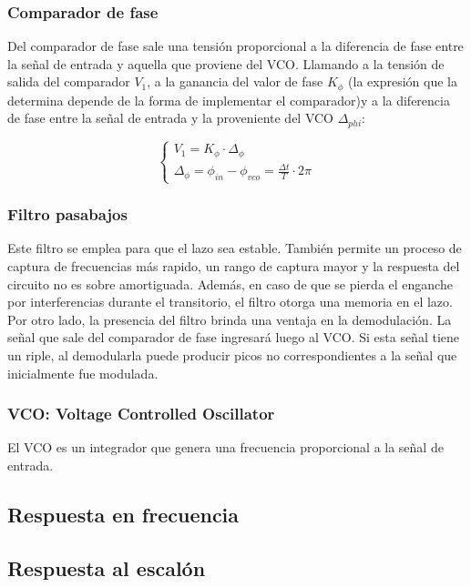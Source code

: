 	\subsubsection{Comparador de fase}
	Del comparador de fase sale una tensi\'on proporcional a la diferencia de fase entre la se\~nal de entrada y aquella que proviene del VCO. Llamando a la tensi\'on de salida del comparador $V_1$, a la ganancia del valor de fase $K_{\phi}$ (la expresi\'on que la determina depende de la forma de implementar el comparador)y a la diferencia de fase entre la se\~nal de entrada y la proveniente del VCO $\Delta_{phi}$:
	
	\begin{equation}
		\begin{cases}
			V_1 = K_{\phi} \cdot \Delta_{\phi} \\
			\Delta_{\phi} = \phi_{in} - \phi_{vco} = \frac{\Delta t}{T}\cdot 2 \pi 	
		\end{cases}
	\end{equation}
	
	\subsubsection{Filtro pasabajos}
	Este filtro se emplea para que el lazo sea estable. Tambi\'en permite un proceso de captura de frecuencias m\'as rapido, un rango de captura mayor y la respuesta del circuito no es sobre amortiguada. Adem\'as, en caso de que se pierda el enganche por interferencias durante el transitorio, el filtro otorga una memoria en el lazo. Por otro lado, la presencia del filtro brinda una ventaja en la demodulaci\'on. La señal que sale del comparador de fase ingresar\'a luego al VCO. Si esta señal tiene un riple, al demodularla puede producir picos no correspondientes a la señal que inicialmente fue modulada.
		
	\subsubsection{VCO: Voltage Controlled Oscillator}
	El VCO es un integrador que genera una frecuencia proporcional a la señal de entrada.
	
\subsection{Respuesta en frecuencia}

\subsection{Respuesta al escal\'on}

